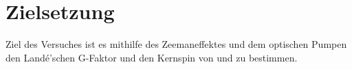 \section{Zielsetzung}
\label{sec:Zielsetzung}
Ziel des Versuches ist es mithilfe des Zeemaneffektes 
und dem optischen Pumpen
den Landé’schen G-Faktor und den Kernspin von  und 
zu bestimmen.

